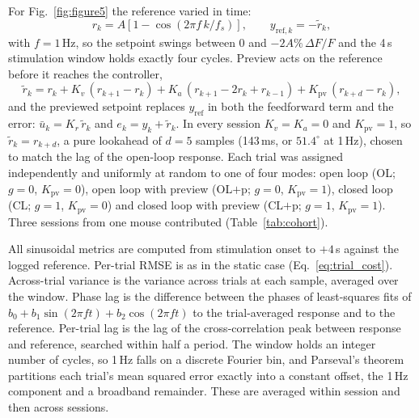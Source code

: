 For Fig.~\ref{fig:figure5} the reference varied in time:
%
\begin{equation}
    r_{k} = A\left[1 - \cos\!\left(2\pi f\,k / f_{s}\right)\right],
    \qquad y_{\mathrm{ref},k} = -\tilde{r}_{k},
    \label{eq:sine_ref}
\end{equation}
%
with $f = 1$\,Hz, so the setpoint swings between 0 and $-2A\%\,\Delta F/F$ and the 4\,s stimulation window holds exactly four cycles.
Preview acts on the reference before it reaches the controller,
%
\begin{equation}
    \tilde{r}_{k} = r_{k} + K_{v}\,(r_{k+1} - r_{k})
                + K_{a}\,(r_{k+1} - 2r_{k} + r_{k-1})
                + K_{\mathrm{pv}}\,(r_{k+d} - r_{k}),
    \label{eq:preview}
\end{equation}
%
and the previewed setpoint replaces $y_{\mathrm{ref}}$ in both the feedforward term and the error: $\bar{u}_{k} = K_{r}\,\tilde{r}_{k}$ and $e_{k} = y_{k} + \tilde{r}_{k}$.
In every session $K_{v} = K_{a} = 0$ and $K_{\mathrm{pv}} = 1$, so $\tilde{r}_{k} = r_{k+d}$, a pure lookahead of $d = 5$ samples (143\,ms, or $51.4^{\circ}$ at 1\,Hz), chosen to match the lag of the open-loop response.
Each trial was assigned independently and uniformly at random to one of four modes: open loop (OL; $g = 0$, $K_{\mathrm{pv}} = 0$), open loop with preview (OL$+$p; $g = 0$, $K_{\mathrm{pv}} = 1$), closed loop (CL; $g = 1$, $K_{\mathrm{pv}} = 0$) and closed loop with preview (CL$+$p; $g = 1$, $K_{\mathrm{pv}} = 1$).
Three sessions from one mouse contributed (Table~\ref{tab:cohort}).

All sinusoidal metrics are computed from stimulation onset to $+4$\,s against the logged reference.
Per-trial RMSE is as in the static case (Eq.~\ref{eq:trial_cost}).
Across-trial variance is the variance across trials at each sample, averaged over the window.
Phase lag is the difference between the phases of least-squares fits of $b_{0} + b_{1}\sin(2\pi f t) + b_{2}\cos(2\pi f t)$ to the trial-averaged response and to the reference.
Per-trial lag is the lag of the cross-correlation peak between response and reference, searched within half a period.
The window holds an integer number of cycles, so 1\,Hz falls on a discrete Fourier bin, and Parseval's theorem partitions each trial's mean squared error exactly into a constant offset, the 1\,Hz component and a broadband remainder.
These are averaged within session and then across sessions.

